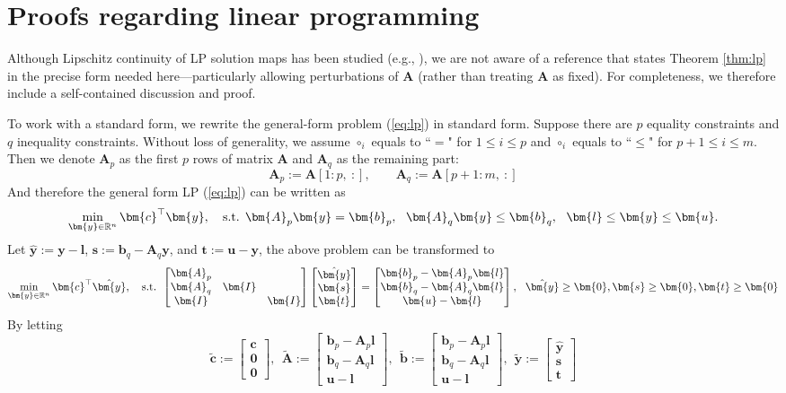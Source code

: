 \documentclass{amsart} %
\def\eqref#1{equation~\ref{#1}}
\def\vzero{{\bm{0}}}
\def\vb{{\bm{b}}}
\def\vc{{\bm{c}}}
\def\vl{{\bm{l}}}
\def\vs{{\bm{s}}}
\def\vt{{\bm{t}}}
\def\vu{{\bm{u}}}
\def\vy{{\bm{y}}}
\def\mA{{\bm{A}}}
\def\mI{{\bm{I}}}
\def\sR{{\mathbb{R}}}
\theoremstyle{definition}
\theoremstyle{remark}
\renewcommand{\eqref}[1]{\textup{(\ref{#1})}}
\begin{document}
\section{Proofs regarding linear programming}
\label{sec:app-lp}
Although Lipschitz continuity of LP solution maps has been studied (e.g., \cite{mangasarian1987lipschitz,dontchev2009implicit}), we are not aware of a reference that states Theorem \ref{thm:lp} in the precise form needed here—particularly allowing perturbations of $\mA$ (rather than treating $\mA$ as fixed). For completeness, we therefore include a self-contained discussion and proof.

To work with a standard form, we rewrite the general-form problem \eqref{eq:lp} in standard form. Suppose there are $p$ equality constraints and $q$ inequality constraints. Without loss of generality, we assume $\circ_i$ equals to ``$=$" for $1 \leq i \leq p$ and $\circ_i$ equals to ``$\leq$" for $p+1 \leq i \leq m$. Then we denote $\mA_p$ as the first $p$ rows of matrix $\mA$ and $\mA_q$ as the remaining part:
\[\mA_p := \mA[1:p, ~:],\qquad \mA_q := \mA[p+1:m, ~ :]\]
And therefore the general form LP \eqref{eq:lp} can be written as
\[\min_{\vy \in \sR^n} \vc^\top \vy, \quad \textup{s.t. } \mA_p \vy = \vb_p, ~~ \mA_q \vy \leq \vb_q, ~~ \vl \leq \vy \leq \vu.  \]
Let $\hat{\vy}:=\vy-\vl$, $\vs := \vb_q - \mA_q \vy$, and $\vt := \vu - \vy$, the above problem can be transformed to
\[
\min_{\vy \in \sR^n} \vc^\top \hat{\vy}, \quad \textup{s.t. } 
\begin{bmatrix}
\mA_p & & \\
\mA_q & \mI & \\
\mI & & \mI 
\end{bmatrix}
\begin{bmatrix}
\hat{\vy} \\
\vs \\
\vt 
\end{bmatrix}
= 
\begin{bmatrix}
\vb_p - \mA_p \vl \\
\vb_q - \mA_q \vl \\
\vu - \vl
\end{bmatrix},
~~
\hat{\vy} \geq \vzero, \vs \geq \vzero, \vt \geq \vzero
\]
By letting
\[
\tilde{\vc}:=\begin{bmatrix}
    \vc \\ \vzero \\ \vzero
\end{bmatrix}, ~~
\tilde{\mA}:=\begin{bmatrix}
\vb_p - \mA_p \vl \\
\vb_q - \mA_q \vl \\
\vu - \vl
\end{bmatrix},~~
\tilde{\vb}:=\begin{bmatrix}
\vb_p - \mA_p \vl \\
\vb_q - \mA_q \vl \\
\vu - \vl
\end{bmatrix},~~
\tilde{\vy}:=\begin{bmatrix}
\hat{\vy} \\
\vs \\
\vt 
\end{bmatrix}
\]
\end{document}
